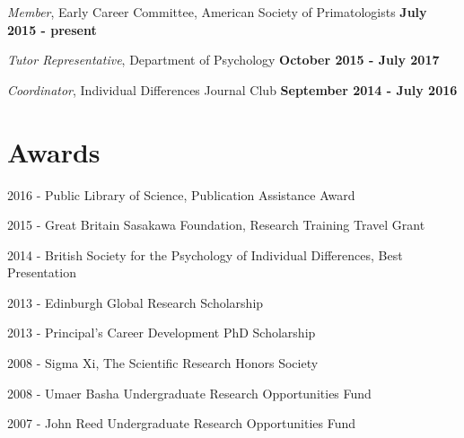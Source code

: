\documentclass[margin,line]{res}
\newenvironment{list1}{
  \begin{list}{\ding{113}}{%
      \setlength{\itemsep}{0in}
      \setlength{\parsep}{0in} \setlength{\parskip}{0in}
      \setlength{\topsep}{0in} \setlength{\partopsep}{0in} 
      \setlength{\leftmargin}{0.17in}}}{\end{list}}
\begin{document}
\begin{resume}
\vspace{-.2cm}
{\em Member}, Early Career Committee, American Society of Primatologists \hfill   {\bf July 2015 - present}\\
\vspace{-.5cm}

\vspace{-.2cm}
{\em Tutor Representative}, Department of Psychology \hfill  {\bf October 2015 - July 2017}\\
\vspace{-.5cm}

\vspace{-.2cm}
{\em Coordinator}, Individual Differences Journal Club \hfill   {\bf September 2014 - July 2016}\\
\vspace{-.5cm}


\vspace{0.7cm}

\section{\sc Awards} 
\begin{list1}

\item[2016] - Public Library of Science, Publication Assistance Award
\item[2015] - Great Britain Sasakawa Foundation, Research Training Travel Grant
\item[2014] - British Society for the Psychology of Individual Differences, Best Presentation
\item[2013] - Edinburgh Global Research Scholarship
\item[2013] - Principal's Career Development PhD Scholarship
\item[2008] - Sigma Xi, The Scientific Research Honors Society
\item[2008] - Umaer Basha Undergraduate Research Opportunities Fund
\item[2007] - John Reed Undergraduate Research Opportunities Fund

\end{list1}

\vspace{0.7cm}



%
%
% 
%
%




\end{resume}
\end{document}
